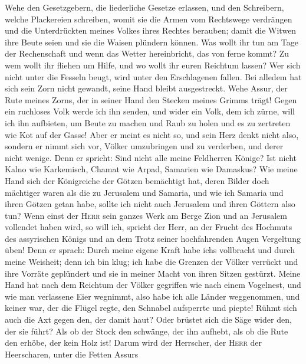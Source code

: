  Wehe den Gesetzgebern, die liederliche Gesetze erlassen,
und den Schreibern, welche Plackereien schreiben,  womit
sie die Armen vom Rechtswege verdrängen und die Unterdrückten meines
Volkes ihres Rechtes berauben; damit die Witwen ihre Beute seien und sie
die Waisen plündern können.  Was wollt ihr tun am Tage der
Rechenschaft und wenn das Wetter hereinbricht, das von ferne kommt? Zu
wem wollt ihr fliehen um Hilfe, und wo wollt ihr euren Reichtum lassen?
 Wer sich nicht unter die Fesseln beugt, wird unter den
Erschlagenen fallen. Bei alledem hat sich sein Zorn nicht gewandt, seine
Hand bleibt ausgestreckt.  Wehe Assur, der Rute meines
Zorns, der in seiner Hand den Stecken meines Grimms trägt!
 Gegen ein ruchloses Volk werde ich ihn senden, und wider
ein Volk, dem ich zürne, will ich ihn aufbieten, um Beute zu machen und
Raub zu holen und es zu zertreten wie Kot auf der Gasse! 
Aber er meint es nicht so, und sein Herz denkt nicht also, sondern er
nimmt sich vor, Völker umzubringen und zu verderben, und derer nicht
wenige.  Denn er spricht: Sind nicht alle meine Feldherren
Könige?  Ist nicht Kalno wie Karkemisch, Chamat wie Arpad,
Samarien wie Damaskus?  Wie meine Hand sich der
Königreiche der Götzen bemächtigt hat, deren Bilder doch mächtiger waren
als die zu Jerusalem und Samaria,  und wie ich Samaria
und ihren Götzen getan habe, sollte ich nicht auch Jerusalem und ihren
Göttern also tun?  Wenn einst der \textsc{Herr} sein
ganzes Werk am Berge Zion und an Jerusalem vollendet haben wird, so will
ich, spricht der Herr, an der Frucht des Hochmuts des assyrischen Königs
und an dem Trotz seiner hochfahrenden Augen Vergeltung üben!
 Denn er sprach: Durch meine eigene Kraft habe
ich\textquotesingle s vollbracht und durch meine Weisheit; denn ich bin
klug; ich habe die Grenzen der Völker verrückt und ihre Vorräte
geplündert und sie in meiner Macht von ihren Sitzen gestürzt.
 Meine Hand hat nach dem Reichtum der Völker gegriffen
wie nach einem Vogelnest, und wie man verlassene Eier wegnimmt, also
habe ich alle Länder weggenommen, und keiner war, der die Flügel regte,
den Schnabel aufsperrte und piepte!  Rühmt sich auch die
Axt gegen den, der damit haut? Oder brüstet sich die Säge wider den, der
sie führt? Als ob der Stock den schwänge, der ihn aufhebt, als ob die
Rute den erhöbe, der kein Holz ist!  Darum wird der
Herrscher, der \textsc{Herr} der Heerscharen, unter die Fetten Assurs
